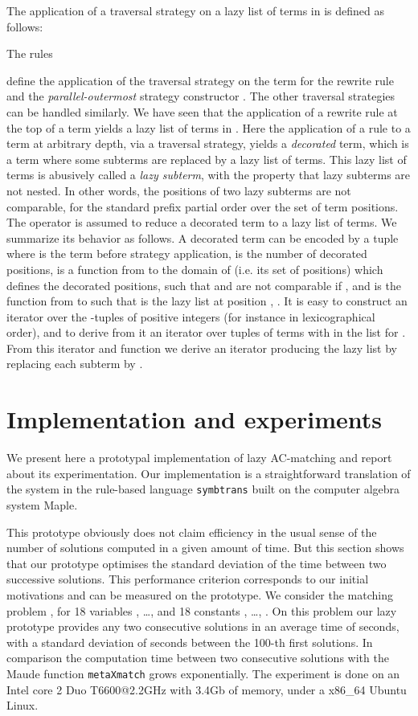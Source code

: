 \documentclass[submission,copyright,creativecommons]{eptcs}
\newcommand \lazy{}
\numberwithin{subcase}{case}
\begin{document}
The application of a traversal strategy on a lazy list of terms in
 is defined as follows:

 The rules

define the application of the traversal strategy  on the term  for the
rewrite rule  and the \textit{parallel-outermost} strategy constructor . 
The other traversal strategies can be handled similarly. We have seen that the
application of a rewrite rule at the top of a term yields a lazy list of terms in
. Here the application of a rule to a term at arbitrary
depth, via a traversal strategy, yields a \emph{decorated} term, which is a term
where some subterms are replaced by a lazy list of terms. This lazy list of
terms is abusively called a \emph{lazy subterm}, with the property that lazy
subterms are not nested. In other words, the positions of two lazy subterms are not comparable, for the
standard prefix partial order over the set of term positions. The operator 
is assumed to reduce a decorated term to a lazy list of terms. We
summarize its behavior as follows. A decorated term can be encoded by a
tuple  where  is the term before strategy application,  is the number of
decorated positions,  is a function from  to the domain of
 (i.e. its set of positions) which defines the decorated positions, such that
 and  are not comparable if , and  is the function
from  to  such that  is the
lazy list at position , . It is easy to construct an
iterator over the -tuples of positive integers (for instance in
lexicographical order), and to derive from it an iterator over tuples of terms
 with  in the list  for .
From this iterator and function  we derive an iterator producing the lazy
list  by replacing each subterm  by .





\section{Implementation and experiments}
\label{implem:sec}
We present here a prototypal implementation of lazy AC-matching and report about
its experimentation. Our implementation  is  a straightforward
translation of the \lazy system in the rule-based language
\texttt{symbtrans} \cite{BGL-JSC10} built on the computer algebra system Maple.

This prototype obviously does not claim
 efficiency in the usual sense of the number of solutions computed in a given
amount of time. But this section shows that our prototype optimises the standard
deviation of the time between two successive solutions. This performance
criterion corresponds to our initial motivations and can be measured on the
prototype. We consider the matching problem
, for 18 variables ,
\ldots,  and 18 constants , \ldots, . On this problem our
lazy prototype provides any two consecutive solutions in an average time of
 seconds, with a standard deviation of  seconds between the 100-th
first solutions. In comparison the computation time between two consecutive
solutions with the Maude function \texttt{metaXmatch} grows exponentially.
The experiment is done on an Intel core 2 Duo T6600@2.2GHz with 3.4Gb of
memory, under a x86\_64 Ubuntu Linux. 
\end{document}
